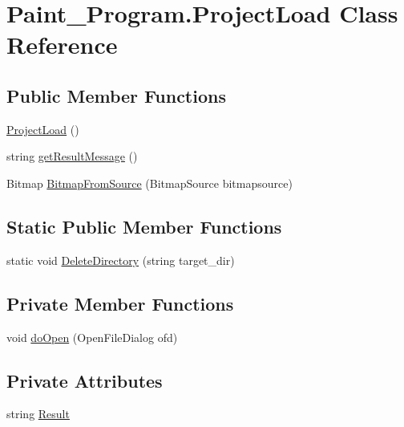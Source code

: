 \hypertarget{class_paint___program_1_1_project_load}{}\section{Paint\+\_\+\+Program.\+Project\+Load Class Reference}
\label{class_paint___program_1_1_project_load}
\subsection*{Public Member Functions}
\begin{DoxyCompactItemize}
\item 
\mbox{\hyperlink{class_paint___program_1_1_project_load_ac157ba176be963e2fde2f6971463c1de}{Project\+Load}} ()
\item 
string \mbox{\hyperlink{class_paint___program_1_1_project_load_ab585a79ec6685412d6c0cf3823a44182}{get\+Result\+Message}} ()
\item 
Bitmap \mbox{\hyperlink{class_paint___program_1_1_project_load_acf6d9bc4b31f71674344fd5436a907b1}{Bitmap\+From\+Source}} (Bitmap\+Source bitmapsource)
\end{DoxyCompactItemize}
\subsection*{Static Public Member Functions}
\begin{DoxyCompactItemize}
\item 
static void \mbox{\hyperlink{class_paint___program_1_1_project_load_a1ee7e642eae28f2bfe36ef04198e467c}{Delete\+Directory}} (string target\+\_\+dir)
\end{DoxyCompactItemize}
\subsection*{Private Member Functions}
\begin{DoxyCompactItemize}
\item 
void \mbox{\hyperlink{class_paint___program_1_1_project_load_aaafd3511899db9404705b14a9e471704}{do\+Open}} (Open\+File\+Dialog ofd)
\end{DoxyCompactItemize}
\subsection*{Private Attributes}
\begin{DoxyCompactItemize}
\item 
string \mbox{\hyperlink{class_paint___program_1_1_project_load_a9db3022290634d4c0c7fad302d03eaba}{Result}}
\end{DoxyCompactItemize}


